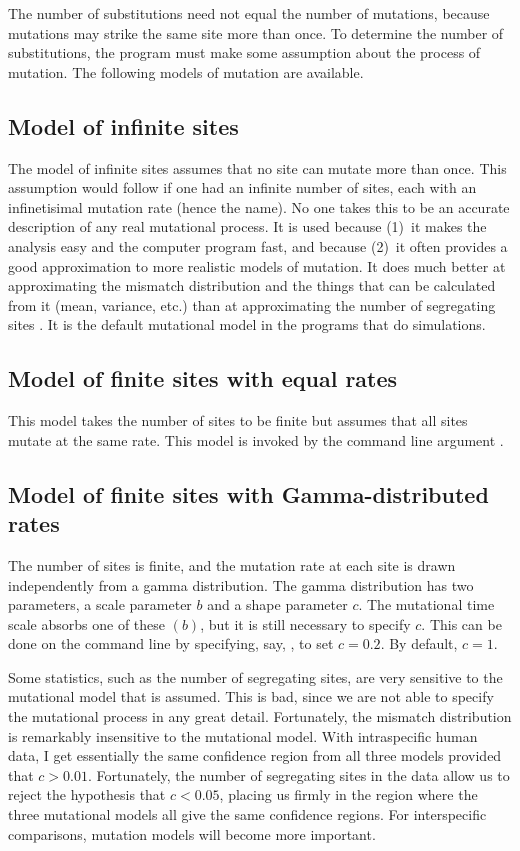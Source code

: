 The number of substitutions need not equal the number of mutations,
because mutations may strike the same site more than once.  To
determine the number of substitutions, the program must make some
assumption about the process of mutation.  The following models of
mutation are available.

\subsection{Model of infinite sites}

The model of infinite sites assumes that no site can mutate more than
once.  This assumption would follow if one had an infinite number of
sites, each with an infinetisimal mutation rate (hence the name).  No
one takes this to be an accurate description of any real mutational
process.  It is used because (1)~it makes the analysis easy and the
computer program fast, and because (2)~it often provides a good
approximation to more realistic models of mutation.  It does much
better at approximating the mismatch distribution and the things that
can be calculated from it (mean, variance, etc.) than at approximating
the number of segregating sites \cite{Rogers:MBE-13-895}.  It is the
default mutational model in the programs that do simulations.

\subsection{Model of finite sites with equal rates}

This model takes the number of sites to be finite but assumes that all
sites mutate at the same rate.  This model is invoked by the command
line argument .

\subsection{Model of finite sites with Gamma-distributed rates}

The number of sites is finite, and the mutation rate at each site is
drawn independently from a gamma distribution.  The gamma distribution
has two parameters, a scale parameter $b$ and a shape parameter $c$.
The mutational time scale absorbs one of these $(b)$, but it is still
necessary to specify $c$.  This can be done on the command line by
specifying, say, , to set $c=0.2$.  By default, $c=1$.

Some statistics, such as the number of segregating sites, are very
sensitive to the mutational model that is assumed.  This is bad, since
we are not able to specify the mutational process in any great detail.
Fortunately, the mismatch distribution is remarkably insensitive to
the mutational model.  With intraspecific human data, I get
essentially the same confidence region from all three models provided
that $c>0.01$.  Fortunately, the number of segregating sites in the
data allow us to reject the hypothesis that $c<0.05$, placing us
firmly in the region where the three mutational models all give the
same confidence regions.  For interspecific comparisons, mutation
models will become more important.

